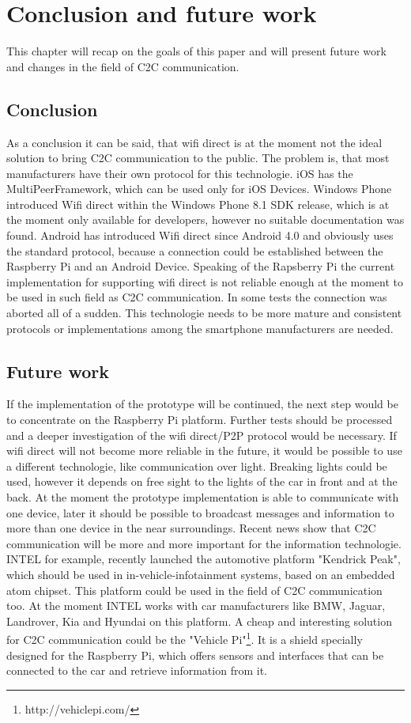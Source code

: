 \chapter{Conclusion and future work}
\label{cha:ConclusionFutureWork}
This chapter will recap on the goals of this paper and will present future work and changes in the field of C2C communication.

\section{Conclusion}
\label{sec:Conclusion}
As a conclusion it can be said, that wifi direct is at the moment not the ideal solution to bring C2C communication to the public. The problem is, that most manufacturers have their own protocol for this technologie. iOS has the MultiPeerFramework, which can be used only for iOS Devices. Windows Phone introduced Wifi direct within the Windows Phone 8.1 SDK release, which is at the moment only available for developers, however no suitable documentation was found. Android has introduced Wifi direct since Android 4.0 and obviously uses the standard protocol, because a connection could be established between the Raspberry Pi and an Android Device. Speaking of the Rapsberry Pi the current implementation for supporting wifi direct is not reliable enough at the moment to be used in such field as C2C communication. In some tests the connection was aborted all of a sudden. This technologie needs to be more mature and consistent protocols or implementations among the smartphone manufacturers are needed.

\section{Future work}
\label{sec:FutureWork}
If the implementation of the prototype will be continued, the next step would be to concentrate on the Raspberry Pi platform. Further tests should be processed and a deeper investigation of the wifi direct/P2P protocol would be necessary. If wifi direct will not become more reliable in the future, it would be possible to use a different technologie, like communication over light. Breaking lights could be used, however it depends on free sight to the lights of the car in front and at the back. At the moment the prototype implementation is able to communicate with one device, later it should be possible to broadcast messages and information to more than one device in the near surroundings. Recent news show that C2C communication will be more and more important for the information technologie. INTEL for example, recently launched the automotive platform "Kendrick Peak", which should be used in in-vehicle-infotainment systems, based on an embedded atom chipset. This platform could be used in the field of C2C communication too. At the moment INTEL works with car manufacturers like BMW, Jaguar, Landrover, Kia and Hyundai on this platform. A cheap and interesting solution for C2C communication could be the "Vehicle Pi"\footnote{http://vehiclepi.com/}. It is a shield specially designed for the Raspberry Pi, which offers sensors and interfaces that can be connected to the car and retrieve information from it. 